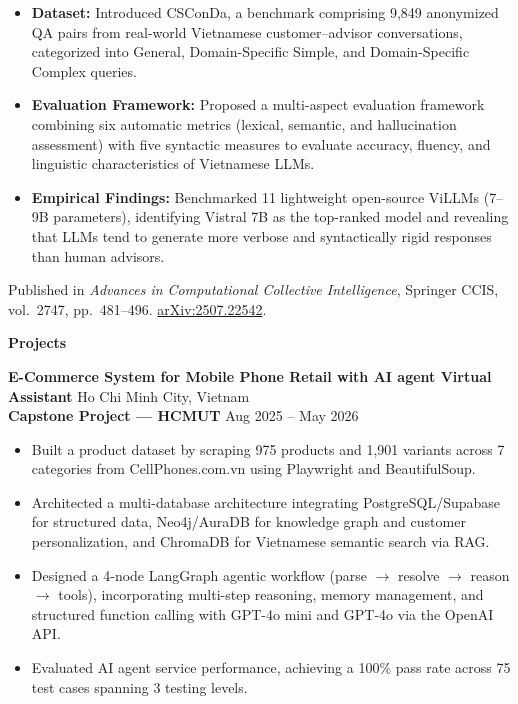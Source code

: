 \documentclass[10pt]{article}
\newcommand{\resumeSection}[1]{%
  \par\vspace{13pt}%
  {\centering\textbf{\large #1}\par}%
  \vspace{6pt}%
}
\newcommand{\resumeSubheading}[4]{%
  \textbf{#1} \hfill #2\\
  \textbf{#3} \hfill #4%
}
\begin{document}
\begin{itemize}
    \item \textbf{Dataset:} Introduced CSConDa, a benchmark comprising 9,849 anonymized QA pairs from real-world Vietnamese customer--advisor conversations, categorized into General, Domain-Specific Simple, and Domain-Specific Complex queries.

    \item \textbf{Evaluation Framework:} Proposed a multi-aspect evaluation framework combining six automatic metrics (lexical, semantic, and hallucination assessment) with five syntactic measures to evaluate accuracy, fluency, and linguistic characteristics of Vietnamese LLMs.

    \item \textbf{Empirical Findings:} Benchmarked 11 lightweight open-source ViLLMs (7--9B parameters), identifying Vistral 7B as the top-ranked model and revealing that LLMs tend to generate more verbose and syntactically rigid responses than human advisors.
\end{itemize}

Published in \textit{Advances in Computational Collective Intelligence},
Springer CCIS, vol.~2747, pp.~481--496.
\href{https://arxiv.org/abs/2507.22542}{arXiv:2507.22542}.

\resumeSection{Projects}

\resumeSubheading
  {E-Commerce System for Mobile Phone Retail with AI agent Virtual Assistant}{Ho Chi Minh City, Vietnam}
  {Capstone Project --- HCMUT}{Aug 2025 -- May 2026}
\begin{itemize}
    \item Built a product dataset by scraping 975 products and 1,901 variants across 7 categories from CellPhones.com.vn using Playwright and BeautifulSoup.

    \item Architected a multi-database architecture integrating PostgreSQL/Supabase for structured data, Neo4j/AuraDB for knowledge graph and customer personalization, and ChromaDB for Vietnamese semantic search via RAG.
    
    \item Designed a 4-node LangGraph agentic workflow (parse $\rightarrow$ resolve $\rightarrow$ reason $\rightarrow$ tools), incorporating multi-step reasoning, memory management, and structured function calling with GPT-4o mini and GPT-4o via the OpenAI API.

    \item Evaluated AI agent service performance, achieving a 100\% pass rate across 75 test cases spanning 3 testing levels.
\end{itemize}
\end{document}
